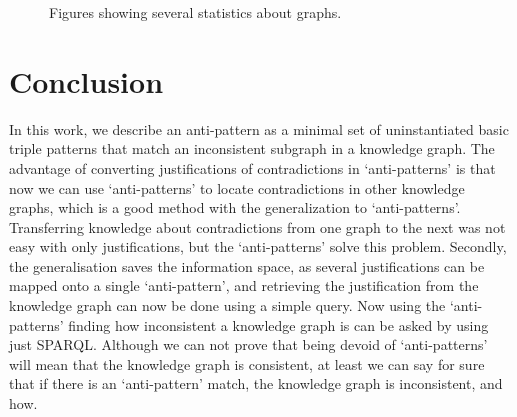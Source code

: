 \documentclass[11pt,letterpaper ,oneside ]{book}
\begin{document}
	\begin{figure}[!t]
		\caption{Figures showing several statistics about graphs.}
		\label{fig:GraphStats}
	\end{figure}
	
	
	\newpage
	
	
	\chapter{Conclusion}\label{Conclusion}
	In this work, we describe an anti-pattern as a minimal set of uninstantiated basic triple patterns that match an inconsistent subgraph in a knowledge graph. The advantage of converting justifications of contradictions in `anti-patterns' is that now we can use `anti-patterns' to locate contradictions in other knowledge graphs, which is a good method with the generalization to `anti-patterns'. Transferring knowledge about contradictions from one graph to the next was not easy with only justifications, but the `anti-patterns' solve this problem. 
	Secondly, the generalisation saves the information space, as several justifications can be mapped onto a single `anti-pattern', and retrieving the justification from the knowledge graph can now be done using a simple query. Now using the `anti-patterns' finding how inconsistent a knowledge graph is can be asked by using just SPARQL. Although we can not prove that being devoid of `anti-patterns' will mean that the knowledge graph is consistent, at least we can say for sure that if there is an `anti-pattern' match, the knowledge graph is inconsistent, and how.  \\
	
\end{document}
